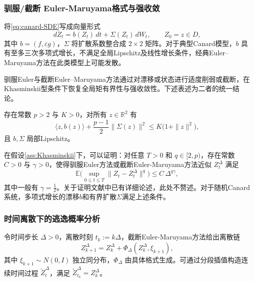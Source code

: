 	\subsubsection{驯服/截断 Euler-Maruyama格式与强收敛}
	
	将\eqref{eq:canard-SDE}写成向量形式
	\begin{equation}\label{eq:vector-SDE}
		dZ_t = b(Z_t)\,dt + \Sigma(Z_t)\,dW_t,\qquad Z_0=z\in D,
	\end{equation}
	其中 \(b=(f,\varepsilon g)\)，\(\Sigma\) 将扩散系数整合成 \(2\times 2\) 矩阵。对于典型Canard模型，\(b\) 具有至多三次多项式增长，不满足全局Lipschitz及线性增长条件，经典Euler–Maruyama方法在此类模型上可能发散。
	
	驯服Euler与截断Euler–Maruyama方法通过对漂移或状态进行适度削弱或截断，在Khasminskii型条件下恢复全局矩有界性与强收敛性。下述表述为二者的统一结论。
	
	\begin{assumption}\label{ass:Khasminskii}
		存在常数 \(p>2\) 与 \(K>0\)，对所有 \(z\in\mathbb{R}^2\) 有
		\begin{equation}\label{eq:Khasminskii}
			\langle z,b(z)\rangle + \frac{p-1}{2}\|\Sigma(z)\|^2 \le K\bigl(1+\|z\|^2\bigr),
		\end{equation}
		且 \(b,\Sigma\) 局部Lipschitz。
	\end{assumption}
	
	在假设\ref{ass:Khasminskii}下，可以证明：对任意 \(T>0\) 和 \(q\in[2,p)\)，存在常数 \(C>0\) 与 \(\gamma>0\)，使得驯服Euler方法或截断Euler-Maruyama方法近似 \(Z_t^\Delta\) 满足
	\begin{equation}\label{eq:strong-convergence}
		\mathbb{E}\Big(\sup_{0\le t\le T}\|Z_t - Z_t^\Delta\|^q\Big)
		\le C\,\Delta^{q\gamma},
	\end{equation}
	其中一般有 \(\gamma=\tfrac12\)。关于证明文献\cite{mao2015truncated}中已有详细论述，此处不赘述。对于随机Canard系统，多项式增长的漂移\(b\)和有界扩散\(\Sigma\)满足上述条件。
	
	\subsubsection{时间离散下的逃逸概率分析}
	
	令时间步长 \(\Delta>0\)，离散时刻 \(t_k:=k\Delta\)，截断Euler-Maruyama方法给出离散链
	\[
	Z_{k+1}^\Delta = Z_k^\Delta + \Phi_\Delta(Z_k^\Delta,\xi_{k+1}),
	\]
	其中 \(\xi_{k+1}\sim N(0,I)\) 独立同分布，\(\Phi_\Delta\) 由具体格式生成。可通过分段插值构造连续时间过程 \(\widetilde{Z}_t^\Delta\)，满足 \(\widetilde{Z}_{t_k}^\Delta = Z_k^\Delta\)。
	
